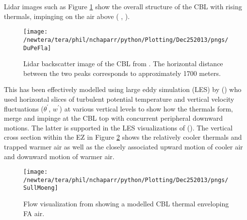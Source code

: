 Lidar images such as Figure \ref{fig:DuPeFla} show the overall structure of the \acs{CBL} with rising thermals, impinging on the air above (\citeauthor{CrumStullEl} \citeyear{CrumStullEl}, \citeauthor{Traum11} \citeyear{Traum11}).  

\begin{figure}[htbp]
    \centering
    \texttt{[image: /newtera/tera/phil/nchaparr/python/Plotting/Dec252013/pngs/DuPeFla]}
    \caption[Lidar backscatter image of the \acs{CBL}]{Lidar backscatter image of the \acs{CBL} from \citeauthor{DuPeFla} \citeyear{DuPeFla}.  The horizontal distance between the two peaks corresponds to approximately 1700 meters.}
    \label{fig:DuPeFla}   %
\end{figure}

This has been effectively modelled using large eddy simulation (\acs{LES}) by \citeauthor{SchmidtSchu} (\citeyear{SchmidtSchu}) who used horizontal slices of turbulent potential temperature and vertical velocity fluctuations ($\theta^{'}$, $w^{'}$) at various vertical levels to show how the thermals form, merge and impinge at the \acs{CBL} top with concurrent peripheral downward motions.  The latter is supported in the \acs{LES} visualizations of \citeauthor{SullMoengStev} (\citeyear{SullMoengStev}).  The vertical cross section within the \acs{EZ} in Figure \ref{fig:SullMoeng} shows the relatively cooler thermals and trapped warmer air as well as the closely associated upward motion of cooler air and downward motion of warmer air.\\ 

\begin{figure}[htbp]
    \centering
    \texttt{[image: /newtera/tera/phil/nchaparr/python/Plotting/Dec252013/pngs/SullMoeng]}
    \caption[Visualization of entrainment from an \acs{LES}]{Flow visualization from \citeauthor{SullMoengStev} \citeyear{SullMoengStev} showing a modelled \acs{CBL} thermal enveloping \acs{FA} air.}
    \label{fig:SullMoeng}   %
\end{figure}

